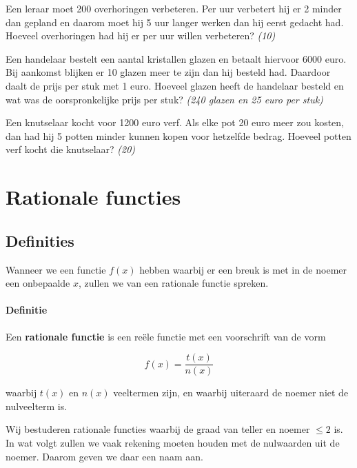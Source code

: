 \documentclass[12pt,twoside,a4paper]{article}
\begin{document}
\begin{oefening}
Een leraar moet 200 overhoringen verbeteren. Per uur verbetert hij er 2 minder dan gepland en daarom moet hij 5 uur langer werken dan hij eerst gedacht had. Hoeveel overhoringen had hij er per uur willen verbeteren? \hfill {\em (10)}
\end{oefening}

\begin{oefening}
Een handelaar bestelt een aantal kristallen glazen en betaalt hiervoor 6000 euro. Bij aankomst blijken er 10 glazen meer te zijn dan hij besteld had. Daardoor daalt de prijs per stuk met 1 euro. Hoeveel glazen heeft de handelaar besteld en wat was de oorspronkelijke prijs per stuk? \hfill {\em (240 glazen en 25 euro per stuk)}
\end{oefening}

\begin{oefening}
Een knutselaar kocht voor 1200 euro verf. Als elke pot 20 euro meer zou kosten, dan had hij 5 potten minder kunnen kopen voor hetzelfde bedrag. Hoeveel potten verf kocht die knutselaar? \hfill {\em (20)}
\end{oefening}

\cleardoublepage
\section{Rationale functies}

\subsection{Definities}

Wanneer we een functie $f(x)$ hebben waarbij er een breuk is met in de noemer een onbepaalde $x$, zullen we van een rationale functie spreken.

\paragraph*{Definitie}
\begin{mdframed}
Een {\bf rationale functie} is een reële functie met een voorschrift van de vorm

$$f(x)=\dfrac{t(x)}{n(x)}$$

waarbij $t(x)$ en $n(x)$ veeltermen zijn, en waarbij uiteraard de noemer niet de nulveelterm is.
\end{mdframed}

Wij bestuderen rationale functies waarbij de graad van teller en noemer $\leq 2$ is. In wat volgt zullen we vaak rekening moeten houden met de nulwaarden uit de noemer. Daarom geven we daar een naam aan.
\end{document}
